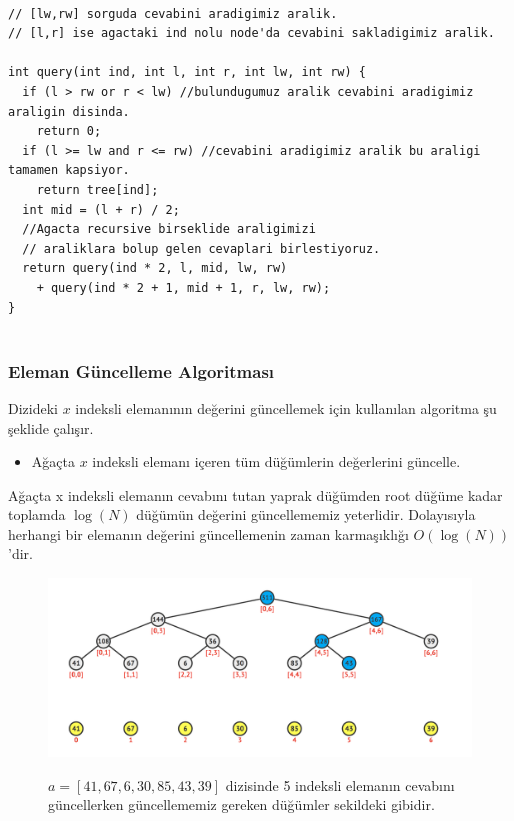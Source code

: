 \documentclass[12pt]{article}
\begin{document}
    \begin{verbatim}

// [lw,rw] sorguda cevabini aradigimiz aralik.
// [l,r] ise agactaki ind nolu node'da cevabini sakladigimiz aralik.

int query(int ind, int l, int r, int lw, int rw) { 
  if (l > rw or r < lw) //bulundugumuz aralik cevabini aradigimiz araligin disinda.
    return 0;
  if (l >= lw and r <= rw) //cevabini aradigimiz aralik bu araligi tamamen kapsiyor.
    return tree[ind];
  int mid = (l + r) / 2;
  //Agacta recursive birseklide araligimizi
  // araliklara bolup gelen cevaplari birlestiyoruz.  
  return query(ind * 2, l, mid, lw, rw) 
    + query(ind * 2 + 1, mid + 1, r, lw, rw);
}
    
    \end{verbatim}    
    
    \subsubsection{Eleman G\"{u}ncelleme Algoritmas{\i}}
    
    Dizideki $x$ indeksli eleman{\i}n{\i}n de\u{g}erini g\"{u}ncellemek i\c{c}in kullan{\i}lan algoritma \c{s}u \c{s}eklide \c{c}al{\i}\c{s}{\i}r.
    
    \begin{itemize}
        \item A\u{g}a\c{c}ta $x$ indeksli eleman{\i} i\c{c}eren t\"{u}m d\"{u}\u{g}\"umlerin de\u{g}erlerini g\"{u}ncelle.
    \end{itemize}
    
    A\u{g}a\c{c}ta x indeksli eleman{\i}n cevab{\i}n{\i} tutan yaprak d\"{u}\u{g}\"{u}mden root d\"{u}\u{g}\"{u}me kadar toplamda $\log(N)$ d\"{u}\u{g}\"{u}m\"{u}n de\u{g}erini g\"{u}ncellememiz yeterlidir. Dolay{\i}s{\i}yla herhangi bir eleman{\i}n de\u{g}erini g\"{u}ncellemenin zaman karma\c{s}{\i}kl{\i}\u{g}{\i} $O(\log(N))$'dir.
    
	\begin{figure}[h]
		\centering
		\includegraphics[width=\linewidth/1]{segtreeupdate.png}
		\label{fig:segtreeupdate}
        \caption{$a = [41,67,6,30,85,43,39]$ dizisinde 5 indeksli eleman{\i}n cevab{\i}n{\i} g\"{u}ncellerken g\"{u}ncellememiz gereken d\"{u}\u{g}\"{u}mler sekildeki gibidir.}
	\end{figure}
    
\end{document}
